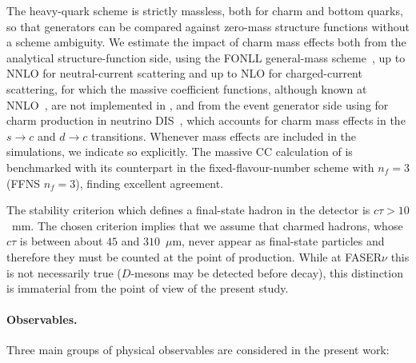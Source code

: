 The heavy-quark scheme is strictly massless, both for charm and bottom quarks, so that generators can be compared against zero-mass structure functions without a scheme ambiguity. 
%
We estimate the impact of charm mass effects both from the analytical structure-function side, using the FONLL general-mass scheme~\cite{Forte:2010ta}, up to NNLO for neutral-current scattering and up to NLO for charged-current scattering, for which the massive coefficient functions, although known at NNLO~\cite{Berger:2016inr,Gao:2017kkx,Caola:2026kvl}, are not implemented in \yadism, and from the event generator side using \powhegtwo for charm production in neutrino DIS~\cite{Buonocore:2024pdv}, which accounts for charm mass effects in the $s\to c$ and $d \to c$ transitions.
%
Whenever mass effects are included in the simulations, we indicate so explicitly. 
%
The massive CC calculation of \powhegtwo is benchmarked with its \yadism counterpart in the fixed-flavour-number scheme with $n_f=3$ (FFNS $n_f=3$), finding excellent agreement. 

The stability criterion which defines a final-state hadron in the detector is $c\tau>10$~mm.
%
The chosen criterion implies that we assume that charmed hadrons, whose $c\tau$ is between about $45$ and $310$~$\mu$m, never appear as final-state particles and therefore  they must be counted at the point of production.
%
While at FASER$\nu$ this is not necessarily true ($D$-mesons may be detected before decay), this distinction is immaterial from the point of view of the present study.

\paragraph{Observables.}
%
Three main groups of physical observables are considered in the present work:

